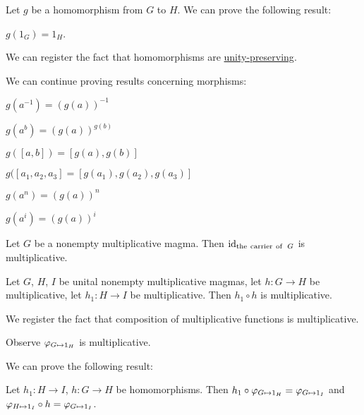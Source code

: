 \documentclass{article}
\begin{document}
Let $g$ be a homomorphism from $G$ to $H$. We can prove the following result:
\begin{thm}
\item\label{group6:31} $g(1_{G})=1_{H}$.
\end{thm}
We can register the fact that homomorphisms are \hyperlink{group1:def13}{unity-preserving}.

We can continue proving results concerning morphisms:
\begin{thm}
\item\label{group6:32} $g(a^{-1})=(g(a))^{-1}$
\item\label{group6:33} $g(a^{b})=(g(a))^{g(b)}$
\item\label{group6:34} $g([a,b])=[g(a),g(b)]$
\item\label{group6:35} $g([a_{1},a_{2},a_{3}]=[g(a_{1}),g(a_{2}),g(a_{3})]$
\item\label{group6:36} $g(a^{n})=(g(a))^{n}$
\item\label{group6:37} $g(a^{i})=(g(a))^{i}$
\item\label{group6:38} Let $G$ be a nonempty multiplicative magma.
  Then $\operatorname{id}_{\operatorname{the\ carrier\ of\ }G}$ is multiplicative.
\item\label{group6:39} Let $G$, $H$, $I$ be unital nonempty
  multiplicative magmas, let $h\colon G\to H$ be multiplicative, let
  $h_{1}\colon H\to I$ be multiplicative. Then $h_{1}\circ h$ is multiplicative.
\end{thm}
We register the fact that composition of multiplicative functions is multiplicative.


Observe $\varphi_{G\mapsto 1_{H}}$ is multiplicative.

We can prove the following result:
\begin{thm}
\item\label{group6:40} Let $h_{1}\colon H\to I$, $h\colon G\to H$ be homomorphisms.
  Then $h_{1}\circ\varphi_{G\mapsto 1_{H}}=\varphi_{G\mapsto 1_{I}}$ and
  $\varphi_{H\mapsto 1_{I}}\circ h=\varphi_{G\mapsto 1_{I}}$.
\end{thm}
\end{document}
